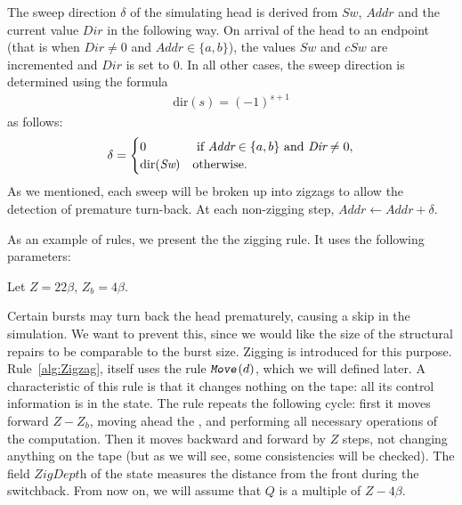 \documentclass[12pt]{memoir}
\newcommand{\fld}[1]{\ensuremath{\textit{#1}}}
\newcommand{\rul}[1]{\ensuremath{\texttt{\slshape #1\/}}}
\newcommand{\Z}{Z}
\newcommand{\Addr}{\fld{Addr}}
\newcommand{\Dir}{\fld{Dir}}
\newcommand{\Sweep}{\fld{Sw}}
\newcommand{\cSweep}{\fld{cSw}}
\newcommand{\ZigDepth}{\fld{ZigDepth}}
\newcommand{\dir}{\mathrm{dir}}
\newcommand{\Move}{\rul{Move}}
\begin{document}
    The sweep direction \( \delta \) of the simulating head is derived from
    \( \Sweep \), \( \Addr \) and the current value \( \Dir \) in the following way.
    On arrival of the head to an endpoint (that is
    when \( \Dir \neq 0 \) and \( \Addr\in\{a,b\} \)), the values
    \( \Sweep \) and \( \cSweep \) are incremented and \( \Dir \) is set to 0.
    In all other cases, the sweep direction is determined
    using the formula
     \begin{align}\label{eq:sweep-dir}
       \dir(s)=(-1)^{s + 1}
     \end{align}
as follows: 
    \begin{equation}\label{eq:Dir}
    \delta =
      \begin{cases}
         0 & \text{ if \( \Addr\in\{a,b\} \) and \( \Dir\neq 0 \)},  \\
           \dir(\Sweep) &\text{otherwise}.
         \end{cases}
    \end{equation}
As we mentioned, each sweep will be broken up into zigzags to
allow the detection of premature turn-back.
At each non-zigging step, \( \Addr \gets \Addr+\delta \).

As an example of rules, we present the the zigging rule.
It uses the following parameters:

\begin{definition}\label{def:Z}
Let \( \Z=22\beta \), \( \Z_{b}=4\beta \).  %
\end{definition}

Certain bursts may turn back the head prematurely,
causing a skip in the simulation.
We want to prevent this, since we 
would like the size of the structural repairs to be comparable to the burst size.
Zigging is introduced for this purpose.
Rule~\ref{alg:Zigzag}, itself uses the rule \( \Move(d) \), which 
we will defined later.  %
A characteristic of this rule is that it changes nothing on the tape:
all its control information is in the state.
The rule repeats the following cycle: first it moves forward \( \Z-\Z_{b} \),
moving ahead the , and performing all necessary operations
of the computation.
Then it moves backward and forward by \( \Z \) steps, not changing anything
on the tape (but as we will see, some consistencies will be checked).
The field \( \ZigDepth \) of the state measures the distance from the front
during the switchback.
From now on, we will assume that \( Q \) is a multiple of \( \Z-4\beta \).

\end{document}
